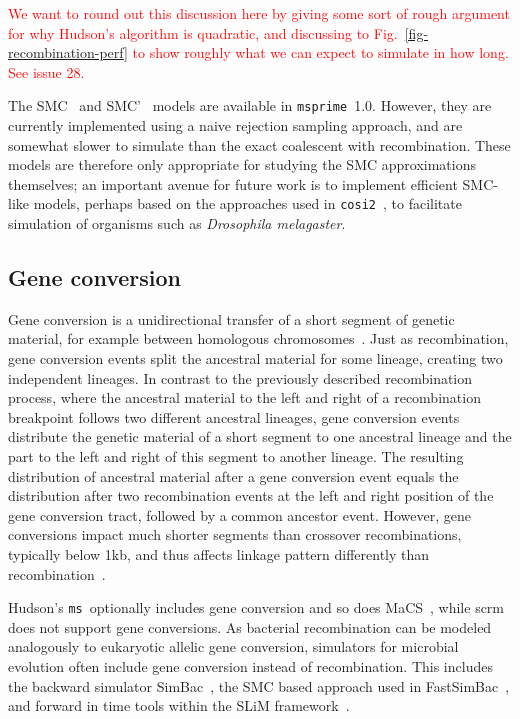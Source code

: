 \documentclass{article}
\newcommand{\msprime}[0]{\texttt{msprime}}
\newcommand{\ms}[0]{\texttt{ms}}
\newcommand{\jkcomment}[1]{\textcolor{red}{#1}}
\begin{document}
\jkcomment{We want to round out this discussion here by giving some
sort of rough argument for why Hudson's algorithm is quadratic, and discussing
to Fig.~\ref{fig-recombination-perf} to show roughly what we can expect
to simulate in how long. See issue 28.}

The SMC~\citep{mcvean2005approximating} and
SMC'~\citep{marjoram2006fast} models are available
in \msprime\ 1.0. However, they are currently implemented using a
naive rejection sampling approach, and are somewhat slower
to simulate than the exact coalescent with recombination. These
models are therefore only appropriate for studying the SMC approximations
themselves; an important avenue for future work is to implement
efficient SMC-like models, perhaps based on the approaches used
in \texttt{cosi2}~\citep{shlyakhter2014cosi2}, to facilitate
simulation of organisms such as \textit{Drosophila melagaster}.


\subsection*{Gene conversion}

Gene conversion is a unidirectional transfer of a short segment of genetic material,
for example between homologous chromosomes~\citep{chen2007gene}.
Just as recombination, gene conversion events split the ancestral material
for some lineage, creating two independent lineages.
In contrast to the previously described recombination process, where the ancestral
material to the left and right of a recombination breakpoint follows two
different ancestral lineages, gene conversion events distribute the genetic material
of a short segment to one ancestral lineage and the part to the left and right of this
segment to another lineage.
The resulting distribution of ancestral material after a gene conversion event
equals the distribution after two recombination events at the left and right position
of the gene conversion tract, followed by a common ancestor event.
However, gene conversions impact much shorter segments than crossover recombinations,
typically below 1kb, and thus affects linkage pattern differently than
recombination~\citep{korunes2017gene}.

Hudson's \ms\ optionally includes gene conversion and so does
MaCS~\citep{chen2009fast}, while scrm~\citep{staab2015scrm} does not
support gene conversions.
As bacterial recombination can be modeled analogously to eukaryotic allelic
gene conversion, simulators for microbial evolution often include gene conversion
instead of recombination.
This includes the backward simulator SimBac~\citep{brown2016simbac},
the SMC based approach used in FastSimBac~\citep{demaio2017the},
and forward in time tools within the SLiM framework~\citep{cury2020simulation}.
\end{document}
